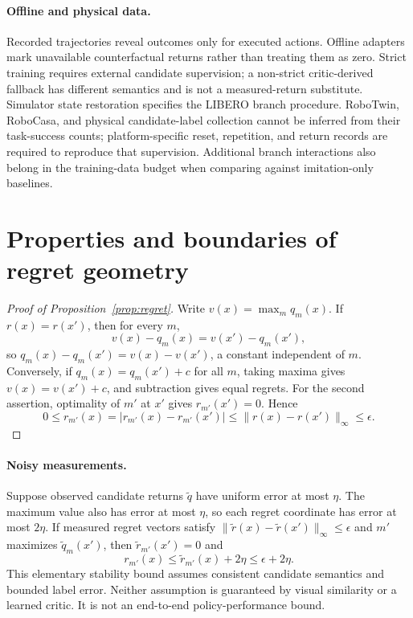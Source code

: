 \documentclass{article}
\begin{document}
\paragraph{Offline and physical data.}
Recorded trajectories reveal outcomes only for executed actions. Offline adapters mark unavailable counterfactual returns rather than treating them as zero. Strict training requires external candidate supervision; a non-strict critic-derived fallback has different semantics and is not a measured-return substitute. Simulator state restoration specifies the LIBERO branch procedure. RoboTwin, RoboCasa, and physical candidate-label collection cannot be inferred from their task-success counts; platform-specific reset, repetition, and return records are required to reproduce that supervision. Additional branch interactions also belong in the training-data budget when comparing against imitation-only baselines.

\section{Properties and boundaries of regret geometry}
\label{app:proof}
\begin{proof}[Proof of Proposition~\ref{prop:regret}]
Write $v(x)=\max_m q_m(x)$. If $r(x)=r(x')$, then for every $m$,
\[
v(x)-q_m(x)=v(x')-q_m(x'),
\]
so $q_m(x)-q_m(x')=v(x)-v(x')$, a constant independent of $m$. Conversely, if $q_m(x)=q_m(x')+c$ for all $m$, taking maxima gives $v(x)=v(x')+c$, and subtraction gives equal regrets. For the second assertion, optimality of $m'$ at $x'$ gives $r_{m'}(x')=0$. Hence
\[
0\leq r_{m'}(x)=|r_{m'}(x)-r_{m'}(x')|
\leq\|r(x)-r(x')\|_\infty\leq\epsilon.
\]
\end{proof}

\paragraph{Noisy measurements.}
Suppose observed candidate returns $\widetilde q$ have uniform error at most $\eta$. The maximum value also has error at most $\eta$, so each regret coordinate has error at most $2\eta$. If measured regret vectors satisfy $\|\widetilde r(x)-\widetilde r(x')\|_\infty\leq\epsilon$ and $m'$ maximizes $\widetilde q_m(x')$, then $\widetilde r_{m'}(x')=0$ and
\[
r_{m'}(x)\leq\widetilde r_{m'}(x)+2\eta\leq\epsilon+2\eta.
\]
This elementary stability bound assumes consistent candidate semantics and bounded label error. Neither assumption is guaranteed by visual similarity or a learned critic. It is not an end-to-end policy-performance bound.
\end{document}

